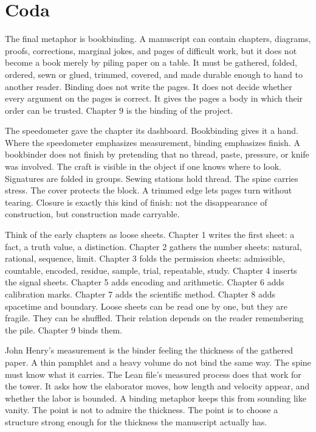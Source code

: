 \section*{Coda}

The final metaphor is bookbinding. A manuscript can contain chapters, diagrams,
proofs, corrections, marginal jokes, and pages of difficult work, but it does
not become a book merely by piling paper on a table. It must be gathered,
folded, ordered, sewn or glued, trimmed, covered, and made durable enough to
hand to another reader. Binding does not write the pages. It does not decide
whether every argument on the pages is correct. It gives the pages a body in
which their order can be trusted. Chapter 9 is the binding of the project.

The speedometer gave the chapter its dashboard. Bookbinding gives it a hand.
Where the speedometer emphasizes measurement, binding emphasizes finish. A
bookbinder does not finish by pretending that no thread, paste, pressure, or
knife was involved. The craft is visible in the object if one knows where to
look. Signatures are folded in groups. Sewing stations hold thread. The spine
carries stress. The cover protects the block. A trimmed edge lets pages turn
without tearing. Closure is exactly this kind of finish: not the disappearance
of construction, but construction made carryable.

Think of the early chapters as loose sheets. Chapter 1 writes the first sheet:
a fact, a truth value, a distinction. Chapter 2 gathers the number sheets:
natural, rational, sequence, limit. Chapter 3 folds the permission sheets:
admissible, countable, encoded, residue, sample, trial, repeatable, study.
Chapter 4 inserts the signal sheets. Chapter 5 adds encoding and arithmetic.
Chapter 6 adds calibration marks. Chapter 7 adds the scientific method.
Chapter 8 adds spacetime and boundary. Loose sheets can be read one by one,
but they are fragile. They can be shuffled. Their relation depends on the
reader remembering the pile. Chapter 9 binds them.

John Henry's measurement is the binder feeling the thickness of the gathered
paper. A thin pamphlet and a heavy volume do not bind the same way. The spine
must know what it carries. The Lean file's measured process does that work for
the tower. It asks how the elaborator moves, how length and velocity appear,
and whether the labor is bounded. A binding metaphor keeps this from sounding
like vanity. The point is not to admire the thickness. The point is to choose
a structure strong enough for the thickness the manuscript actually has.

